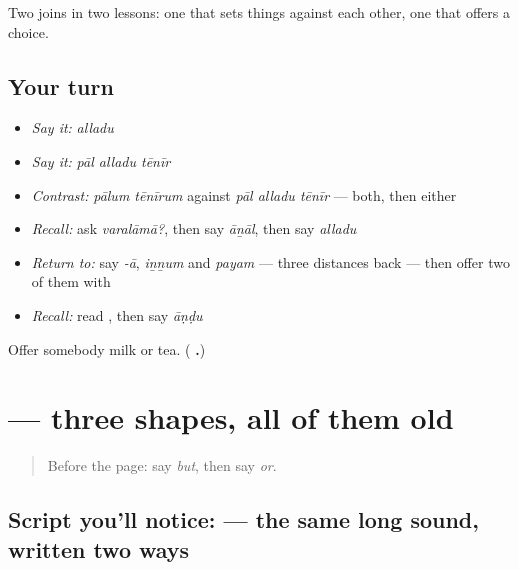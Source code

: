 \begin{grammarlens}[title={What you've built}]
Two joins in two lessons: one that sets things against each other, one that offers a choice.
\end{grammarlens}

\subsection*{Your turn}
\begin{itemize}
\raggedright
  \item \emph{Say it:} \emph{alladu}
  \item \emph{Say it:} \emph{pāl alladu tēnīr}
  \item \emph{Contrast:} \emph{pālum tēnīrum} against \emph{pāl alladu tēnīr} — both, then either
  \item \emph{Recall:} ask \emph{varalāmā?}, then say \emph{āṉāl}, then say \emph{alladu}
  \item \emph{Return to:} say \emph{-ā}, \emph{iṉṉum} and \emph{payam} — three distances back — then offer two of them with 
  \item \emph{Recall:} read \textbf{}, then say \emph{āṇḍu}
\end{itemize}

\begin{tcolorbox}[breakable,colback=teal!4,colframe=teal!35!black,title={Before you move on}]
Offer somebody milk or tea. (\textbf{  .})
\end{tcolorbox}
\section[\texorpdfstring{\ta{ஆனால்} (āṉāl)}{ஆனால் (āṉāl)}]{ — three shapes, all of them old}

\label{lesson:TA-W31-read-aanaal}



\begin{quote}
Before the page: say \emph{but}, then say \emph{or}.
\end{quote}

\subsection*{Script you'll notice:  — the same long sound, written two ways}

